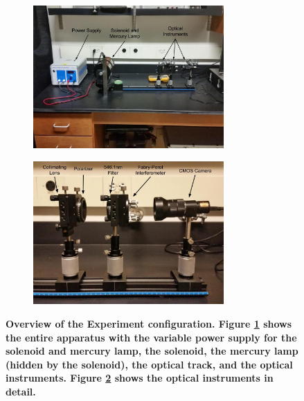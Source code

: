 \documentclass[twocolumn]{article}
\begin{document}
	\begin{figure}
		\centering
		\begin{subfigure}{0.5\textwidth}
			\includegraphics[width = 0.8\textwidth]{Images/ExperimentOverview.jpg}
			\caption{}
			\label{subfig:Overview}
			
		\end{subfigure}%
		\begin{subfigure}{0.5\textwidth}
				\includegraphics[width = 0.8\textwidth]{Images/OpticsRail.jpg}
				\caption{}
				\label{subfig:OpticsRail}
				
		\end{subfigure}%
		\caption{\textbf{Overview of the Experiment configuration. Figure \ref{subfig:Overview} shows the entire apparatus with the variable power supply for the solenoid and mercury lamp, the solenoid, the mercury lamp (hidden by the solenoid), the optical track, and the optical instruments. Figure \ref{subfig:OpticsRail} shows the optical instruments in detail.}}
		\label{fig:ContextView}
	\end{figure}
	
\end{document}
